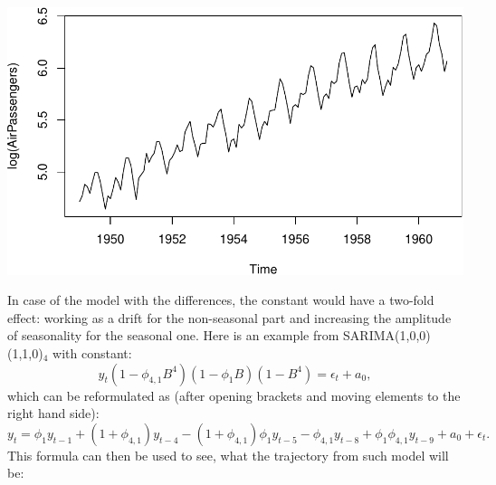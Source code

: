 \documentclass[
]{book}
\theoremstyle{definition}
\theoremstyle{definition}
\theoremstyle{definition}
\theoremstyle{definition}
\theoremstyle{remark}
\begin{document}
\includegraphics{adam_files/figure-latex/unnamed-chunk-50-1.pdf}

In case of the model with the differences, the constant would have a two-fold effect: working as a drift for the non-seasonal part and increasing the amplitude of seasonality for the seasonal one. Here is an example from SARIMA(1,0,0)(1,1,0)\(_4\) with constant:
\begin{equation}
  y_t (1 - \phi_{4,1} B^4)(1 - \phi_{1} B) (1 - B^4) = \epsilon_t + a_0 ,
  \label{eq:SARIMA101110Example01}
\end{equation}
which can be reformulated as (after opening brackets and moving elements to the right hand side):
\begin{equation}
  y_t = \phi_{1} y_{t-1} + (1+\phi_{4,1}) y_{t-4} - (1+\phi_{4,1}) \phi_{1} y_{t-5} - \phi_{4,1} y_{t-8} + \phi_1 \phi_{4,1} y_{t-9} + a_0 + \epsilon_t .
  \label{eq:SARIMA101110Example02}
\end{equation}
This formula can then be used to see, what the trajectory from such model will be:
\end{document}
